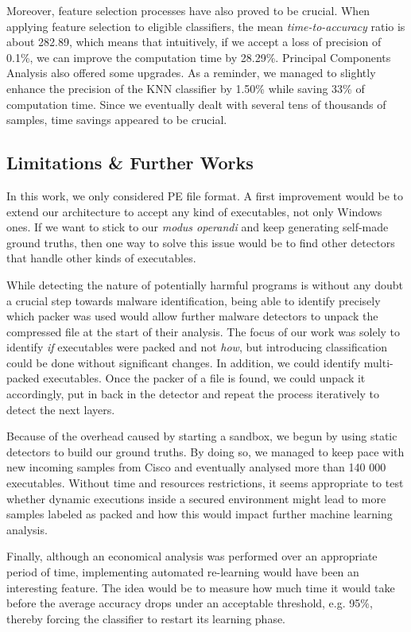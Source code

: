 Moreover, feature selection processes have also proved to be crucial. When applying feature selection to eligible classifiers, the mean \textit{time-to-accuracy} ratio is about 282.89, which means that intuitively, if we accept a loss of precision of 0.1\%, we can improve the computation time by 28.29\%. Principal Components Analysis also offered some upgrades. As a reminder, we managed to slightly enhance the precision of the KNN classifier by 1.50\% while saving 33\% of computation time. Since we eventually dealt with several tens of thousands of samples, time savings appeared to be crucial.

\subsection*{Limitations \& Further Works}

In this work, we only considered PE file format. A first improvement would be to extend our architecture to accept any kind of executables, not only Windows ones. If we want to stick to our \textit{modus operandi} and keep generating self-made ground truths, then one way to solve this issue would be to find other detectors that handle other kinds of executables.

While detecting the nature of potentially harmful programs is without any doubt a crucial step towards malware identification, being able to identify precisely which packer was used would allow further malware detectors to unpack the compressed file at the start of their analysis. The focus of our work was solely to identify \textit{if} executables were packed and not \textit{how}, but introducing classification could be done without significant changes. In addition, we could identify multi-packed executables. Once the packer of a file is found, we could unpack it accordingly, put in back in the detector and repeat the process iteratively to detect the next layers.

Because of the overhead caused by starting a sandbox, we begun by using static detectors to build our ground truths. By doing so, we managed to keep pace with new incoming samples from Cisco and eventually analysed more than 140 000 executables. Without time and resources restrictions, it seems appropriate to test whether dynamic executions inside a secured environment might lead to more samples labeled as packed and how this would impact further machine learning analysis.

Finally, although an economical analysis was performed over an appropriate period of time, implementing automated re-learning would have been an interesting feature. The idea would be to measure how much time it would take before the average accuracy drops under an acceptable threshold, e.g. 95\%, thereby forcing the classifier to restart its learning phase.

